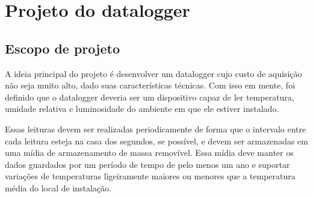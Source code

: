 \chapter{Projeto do datalogger}
\label{chap:metodologia}



\section{Escopo de projeto}




A ideia principal do projeto é desenvolver um datalogger cujo custo de aquisição não seja muito alto, dado suas características técnicas. Com isso em mente, foi definido que o datalogger deveria ser um dispositivo capaz de ler temperatura, umidade relativa e luminosidade do ambiente em que ele estiver instalado. 

Essas leituras devem ser realizadas periodicamente de forma que o intervalo entre cada leitura esteja na casa dos segundos, se possível, e devem ser armazenadas em uma mídia de armazenamento de massa removível. Essa mídia deve manter os dados guardados por um período de tempo  de pelo menos um ano e suportar variações de temperaturas ligeiramente maiores ou menores que a temperatura média do local de instalação.

